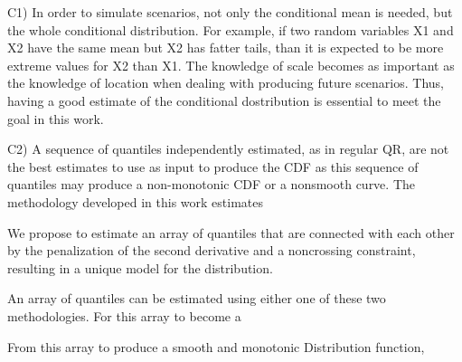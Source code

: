 C1) In order to simulate scenarios, not only the conditional mean is needed, but the whole conditional distribution. For example, if two random variables X1 and X2 have the same mean but X2 has fatter tails, than it is expected to be more extreme values for X2 than X1. The knowledge of scale becomes as important as the knowledge of location when dealing with producing future scenarios.  Thus, having a good estimate of the conditional dostribution is essential to meet the goal in this work. 

C2) A sequence of quantiles independently estimated, as in regular QR, are not the best estimates to use as input to produce the CDF as this sequence of quantiles may produce a non-monotonic CDF or a nonsmooth curve. The methodology developed in this work estimates 

We propose to estimate an array of quantiles that are connected with each other by the penalization of the second derivative and a noncrossing constraint, resulting in a unique model for the distribution. 

An array of quantiles can be estimated using either one of these two methodologies. For this array to become a 

From this array to produce a smooth and monotonic Distribution function, 